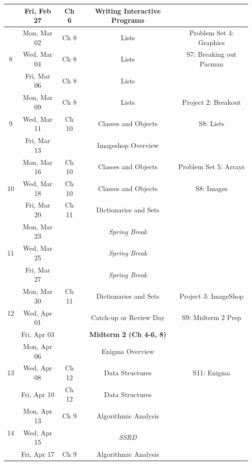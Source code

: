 \documentclass[varwidth]{standalone}
\begin{document}
\begin{longtable}{ccccc}
& \multirow{1}{*}{Fri, Feb 27} & Ch 6 & Writing Interactive Programs &  \\
\midrule
\multirow{3}{*}{8} & \multirow{1}{*}{Mon, Mar 02} & Ch 8 & Lists & Problem Set 4: Graphics \\
& \multirow{1}{*}{Wed, Mar 04} & Ch 8 & Lists & S7: Breaking out Pacman \\
& \multirow{1}{*}{Fri, Mar 06} & Ch 8 & Lists &  \\
\midrule
\multirow{3}{*}{9} & \multirow{1}{*}{Mon, Mar 09} & Ch 8 & Lists & Project 2: Breakout \\
& \multirow{1}{*}{Wed, Mar 11} & Ch 10 & Classes and Objects & S8: Lists \\
& \multirow{1}{*}{Fri, Mar 13} &  & Imageshop Overview &  \\
\midrule
\multirow{3}{*}{10} & \multirow{1}{*}{Mon, Mar 16} & Ch 10 & Classes and Objects & Problem 
Set 5: Arrays \\
& \multirow{1}{*}{Wed, Mar 18} & Ch 10 & Classes and Objects & S8: Images \\
& \multirow{1}{*}{Fri, Mar 20} & Ch 11 & Dictionaries and Sets &  \\
\midrule
\multirow{3}{*}{11} & \multirow{1}{*}{Mon, Mar 23} &  & \emph{Spring Break} &  \\
& \multirow{1}{*}{Wed, Mar 25} &  & \emph{Spring Break} &  \\
& \multirow{1}{*}{Fri, Mar 27} &  & \emph{Spring Break} &  \\
\midrule
\multirow{3}{*}{12} & \multirow{1}{*}{Mon, Mar 30} & Ch 11 & Dictionaries and Sets & Project 
3: ImageShop \\
& \multirow{1}{*}{Wed, Apr 01} &  & Catch-up or Review Day & S9: Midterm 2 Prep \\
& \multirow{1}{*}{Fri, Apr 03} &  & \textbf{Midterm 2 (Ch 4-6, 8)} &  \\
\midrule
\multirow{3}{*}{13} & \multirow{1}{*}{Mon, Apr 06} &  & Enigma Overview &  \\
& \multirow{1}{*}{Wed, Apr 08} & Ch 12 & Data Structures & S11: Enigma \\
& \multirow{1}{*}{Fri, Apr 10} & Ch 12 & Data Structures &  \\
\midrule
\multirow{3}{*}{14} & \multirow{1}{*}{Mon, Apr 13} & Ch 9 & Algorithmic Analysis &  \\
& \multirow{1}{*}{Wed, Apr 15} &  & \emph{SSRD} &  \\
& \multirow{1}{*}{Fri, Apr 17} & Ch 9 & Algorithmic Analysis &  \\

\end{longtable}
\end{document}
